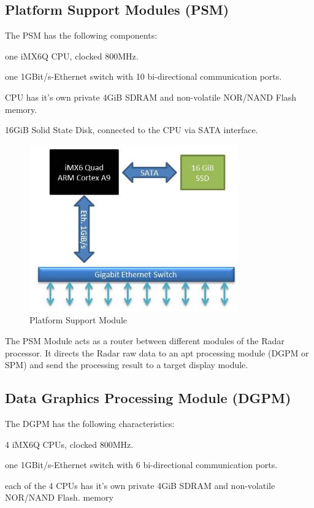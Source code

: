 \subsection{Platform Support Modules (PSM)}
\label{ss:bg_related_work:psm}
The PSM has the following components:
\begin{compactitem} 
	\item one iMX6Q CPU, clocked 800MHz.
	\item one 1GBit/s-Ethernet switch with 10 bi-directional communication ports.
	\item CPU has it's own private 4GiB SDRAM and non-volatile NOR/NAND Flash memory.
	\item 16GiB Solid State Disk, connected to the CPU via SATA interface.
\end{compactitem}

\begin{figure}[h!]
	\centering
	\includegraphics[width=90mm]{figures/psm}
	\caption{Platform Support Module \cite{fcas}}
	\label{fig:bg_related_work:ima:psm}
\end{figure}

The PSM Module acts as a router between different modules of the Radar processor. It directs the Radar raw data to an apt processing module (DGPM or SPM) and send the processing result to a target display module.

\subsection{Data Graphics Processing Module (DGPM)}
\label{ss:bg_related_work:dgpm}
The DGPM has the following characteristics:
\begin{compactitem} 
	\item 4 iMX6Q CPUs, clocked 800MHz.
	\item one 1GBit/s-Ethernet switch with 6 bi-directional communication ports.
	\item each of the 4 CPUs has it's own private 4GiB SDRAM and non-volatile NOR/NAND Flash.
memory \\
\end{compactitem}

